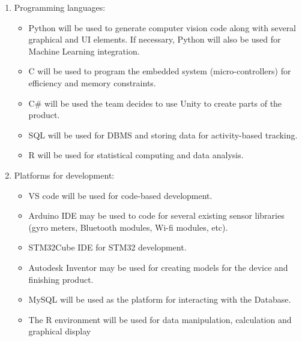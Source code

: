 \documentclass[12pt]{article}
\begin{document}
\begin{enumerate}
\item Programming languages:
\begin{itemize}
\item Python will be used to generate computer vision code along with several graphical and UI elements. If necessary, Python will also be used for Machine Learning integration.
\item C will be used to program the embedded system (micro-controllers) for efficiency and memory constraints.
\item C\# will be used the team decides to use Unity to create parts of the product.
\item SQL will be used for DBMS and storing data for activity-based tracking.
\item R will be used for statistical computing and data analysis.
\end{itemize}
\item Platforms for development:
\begin{itemize}
\item VS code will be used for code-based development.
\item Arduino IDE may be used to code for several existing sensor libraries (gyro meters, Bluetooth modules, Wi-fi modules, etc).
\item STM32Cube IDE for STM32 development. 
\item Autodesk Inventor may be used for creating models for the device and finishing product.
\item MySQL will be used as the platform for interacting with the Database.
\item The R environment will be used for data manipulation, calculation and graphical display\\\\
\end{itemize}


\end{enumerate}
\end{document}
